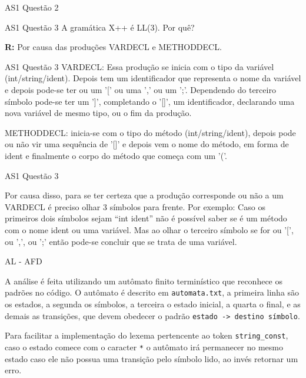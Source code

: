 \documentclass[10pt]{beamer}
\begin{document}
\begin{frame}{AS1 Questão 2}

\end{frame}

\begin{frame}{AS1 Questão 3}
    A gramática X++ é LL(3). Por quê?

    \textbf{R:} Por causa das produções VARDECL e METHODDECL.

\end{frame}

\begin{frame}{AS1 Questão 3}
    VARDECL: Essa produção se inicia com o tipo da variável (int/string/ident).
    Depois tem um identificador que representa o nome da variável e depois
    pode-se ter ou um '[' ou uma ',' ou um ';'. Dependendo do terceiro símbolo
    pode-se ter um ']', completando o '[]', um identificador, declarando uma
    nova variável de mesmo tipo, ou o fim da produção.

    METHODDECL: inicia-se com o tipo do método (int/string/ident), depois pode
    ou não vir uma sequência de '[]' e depois vem o nome do método, em forma de
    ident e finalmente o corpo do método que começa com um '('.

\end{frame}

\begin{frame}{AS1 Questão 3}

    Por causa disso, para se ter certeza que a produção corresponde ou não a um
    VARDECL é preciso olhar 3 símbolos para frente. Por exemplo: Caso os
    primeiros dois símbolos sejam ``int ident'' não é possível saber se é um
    método com o nome ident ou uma variável. Mas ao olhar o terceiro símbolo se
    for ou '[', ou ',', ou ';' então pode-se concluir que se trata de uma
    variável.

\end{frame}

\begin{frame}{AL - AFD}

    A análise é feita utilizando um autômato finito terminístico que reconhece
    os padrões no código. O autômato é descrito em \texttt{automata.txt}, a 
    primeira linha são os estados, a segunda os símbolos, a terceira o estado
    inicial, a quarta o final, e as demais as transições, que devem obedecer o
    padrão \texttt{estado -> destino símbolo}.

    Para facilitar a implementação do lexema pertencente ao token
    \texttt{string\_const}, caso o estado comece com o caracter \texttt{*} o
    autômato irá permanecer no mesmo estado caso ele não possua uma transição
    pelo símbolo lido, ao invés retornar um erro.

\end{frame}
\end{document}
